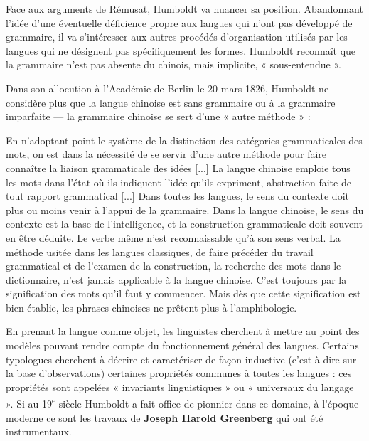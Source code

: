 Face aux arguments de Rémusat, Humboldt va nuancer sa position. Abandonnant l’idée d’une éventuelle déficience propre aux langues qui n’ont pas développé de grammaire, il va s’intéresser aux autres procédés d’organisation utilisés par les langues qui ne désignent pas spécifiquement les formes. Humboldt reconnaît que la grammaire n’est pas absente du chinois, mais implicite, « sous-entendue ».

Dans son allocution à l’Académie de Berlin le 20 mars 1826, Humboldt ne considère plus que la langue chinoise est sans grammaire ou à la grammaire imparfaite --- la grammaire chinoise se sert d’une « autre méthode » :
\begin{lecture}{}
En n’adoptant point le système de la distinction des catégories grammaticales des mots, on est dans la nécessité de se servir d’une autre méthode pour faire connaître la liaison grammaticale des idées [...] La langue chinoise emploie tous les mots dans l’état où ils indiquent l’idée qu’ils expriment, abstraction faite de tout rapport grammatical [...] Dans toutes les langues, le sens du contexte doit plus ou moins venir à l’appui de la grammaire. Dans la langue chinoise, le sens du contexte est la base de l’intelligence, et la construction grammaticale doit souvent en être déduite. Le verbe même n’est reconnaissable qu’à son sens verbal. La méthode usitée dans les langues classiques, de faire précéder du travail grammatical et de l’examen de la construction, la recherche des mots dans le dictionnaire, n’est jamais applicable à la langue chinoise. C’est toujours par la signification des mots qu’il faut y commencer. Mais dès que cette signification est bien établie, les phrases chinoises ne prêtent plus à l’amphibologie.
\end{lecture}

En prenant la langue comme objet, les linguistes cherchent à mettre au point des modèles pouvant rendre compte du fonctionnement général des langues. Certains typologues cherchent à décrire et caractériser de façon inductive (c’est-à-dire sur la base d’observations) certaines propriétés communes à toutes les langues : ces propriétés sont appelées « invariants linguistiques » ou « universaux du langage ». Si au 19\textsuperscript{e} siècle Humboldt a fait office de pionnier dans ce domaine, à l’époque moderne ce sont les travaux de \textbf{Joseph Harold Greenberg} qui ont été instrumentaux.

